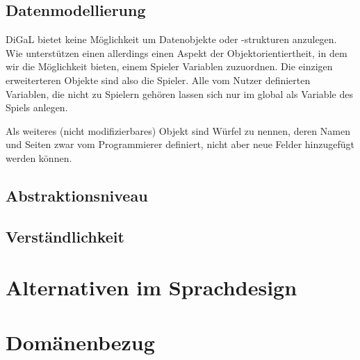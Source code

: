 \subsection{Datenmodellierung} %
\label{sub:datenmodellierung}
DiGaL bietet keine Möglichkeit um Datenobjekte oder -strukturen anzulegen. Wie unterstützen einen allerdings einen Aspekt der Objektorientiertheit, in dem wir die Möglichkeit bieten, einem Spieler Variablen zuzuordnen. Die einzigen erweiterteren Objekte sind also die Spieler. Alle vom Nutzer definierten Variablen, die nicht zu Spielern gehören lassen sich nur im global als Variable des Spiels anlegen.

Als weiteres (nicht modifizierbares) Objekt sind Würfel zu nennen, deren Namen und Seiten zwar vom Programmierer definiert, nicht aber neue Felder hinzugefügt werden können.

\subsection{Abstraktionsniveau} %
\label{sub:abstraktionsniveau}


\subsection{Verständlichkeit} %
\label{sub:verstandlichkeit}



\section{Alternativen im Sprachdesign} %
\label{sec:alternativen_im_sprachdesign}


\section{Domänenbezug} %
\label{sec:domanenbezug}

